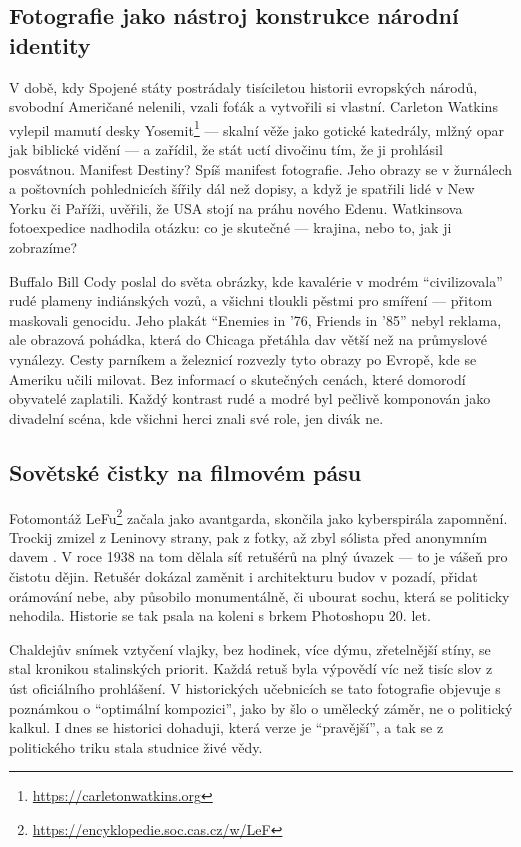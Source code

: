 \documentclass[12pt]{article}
\begin{document}
\subsection{Fotografie jako nástroj konstrukce národní identity}
V době, kdy Spojené státy postrádaly tisíciletou historii evropských národů, svobodní Američané nelenili, vzali foťák a 
vytvořili si vlastní. Carleton Watkins vylepil mamutí desky 
Yosemit\footnote{\url{https://carletonwatkins.org}} --- skalní věže jako gotické katedrály, mlžný opar jak biblické 
vidění --- a zařídil, že stát uctí divočinu tím, že ji prohlásil posvátnou. Manifest Destiny? Spíš manifest fotografie. 
Jeho obrazy se v žurnálech a poštovních pohlednicích šířily dál než dopisy, a když je spatřili lidé v New Yorku či 
Paříži, uvěřili, že USA stojí na práhu nového Edenu. Watkinsova fotoexpedice nadhodila otázku: co je skutečné --- 
krajina, nebo to, jak ji zobrazíme?

Buffalo Bill Cody poslal do světa obrázky, kde kavalérie v modrém \enquote{civilizovala} rudé plameny indiánských vozů, 
a všichni tloukli pěstmi pro smíření --- přitom maskovali genocidu. Jeho plakát 
\enquote{Enemies in '76, Friends in '85}\cite{buffalo} nebyl reklama, ale obrazová pohádka, která do Chicaga přetáhla 
dav větší než na průmyslové vynálezy. Cesty parníkem a železnicí rozvezly tyto obrazy po Evropě, kde se Ameriku učili 
milovat. Bez informací o skutečných cenách, které domorodí obyvatelé zaplatili. Každý kontrast rudé a modré byl pečlivě 
komponován jako divadelní scéna, kde všichni herci znali své role, jen divák ne.

\subsection{Sovětské čistky na filmovém pásu}
Fotomontáž LeFu\footnote{\url{https://encyklopedie.soc.cas.cz/w/LeF}} začala jako avantgarda, skončila jako kyberspirála 
zapomnění. Trockij zmizel z Leninovy strany, pak z fotky, až zbyl sólista před anonymním davem \cite{trockij}. V roce 
1938 na tom dělala síť retušérů na plný úvazek --- to je vášeň pro čistotu dějin. Retušér dokázal zaměnit i architekturu 
budov v pozadí, přidat orámování nebe, aby působilo monumentálně, či ubourat sochu, která se politicky nehodila. 
Historie se tak psala na koleni s brkem Photoshopu 20. let.\cite{retus}

Chaldejův snímek vztyčení vlajky\cite{reichstag}, bez hodinek, více dýmu, zřetelnější stíny, se stal kronikou 
stalinských priorit. Každá retuš byla výpovědí víc než tisíc slov z úst oficiálního prohlášení. V historických 
učebnicích se tato fotografie objevuje s poznámkou o \enquote{optimální kompozici}, jako by šlo o umělecký záměr, ne o 
politický kalkul. I dnes se historici dohaduji, která verze je \enquote{pravější}, a tak se z politického triku stala 
studnice živé vědy.
\newpage
\end{document}
